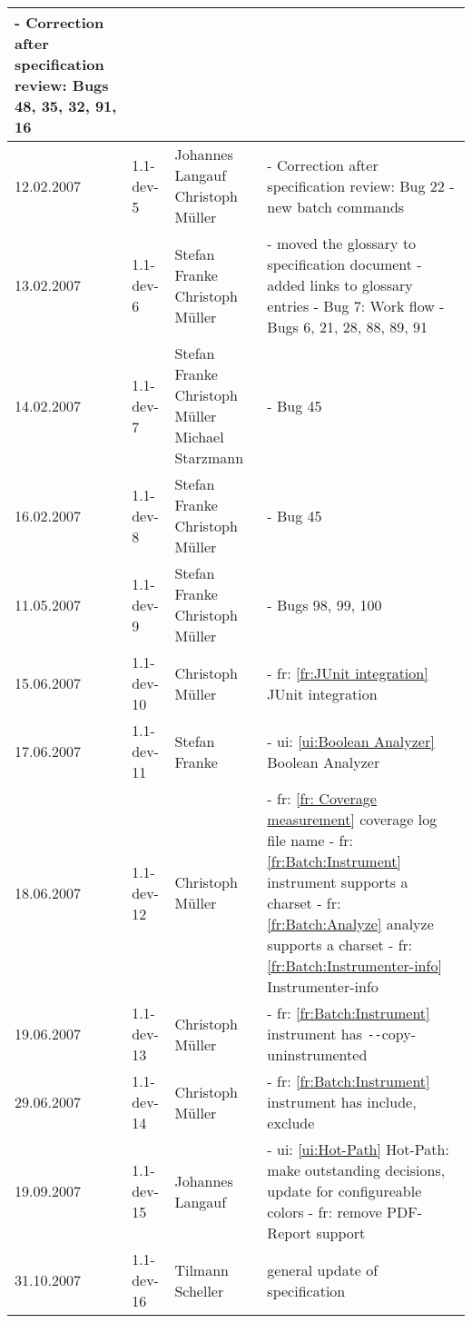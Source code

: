 {\begin{longtable}{|l|l|p{35mm}|p{71mm}|}
      - Correction after specification review: Bugs 48, 35, 32, 91, 16 \\\hline
    12.02.2007 & 1.1-dev-5 & Johannes Langauf \newline Christoph Müller  &
      - Correction after specification review: Bug 22 \newline
      - new batch commands \\\hline
    13.02.2007 & 1.1-dev-6 & Stefan Franke \newline Christoph Müller &
      - moved the glossary to specification document \newline
      - added links to glossary entries \newline
      - Bug 7: Work flow \newline
      - Bugs 6, 21, 28, 88, 89, 91\\\hline
    14.02.2007 & 1.1-dev-7 & Stefan Franke \newline Christoph Müller \newline Michael Starzmann &
      - Bug 45 \\\hline
    16.02.2007 & 1.1-dev-8 & Stefan Franke \newline Christoph Müller &
      - Bug 45 \\\hline
    11.05.2007 & 1.1-dev-9 & Stefan Franke \newline Christoph Müller &
      - Bugs 98, 99, 100 \\\hline
    15.06.2007 & 1.1-dev-10 & Christoph Müller & 
      - fr: \ref{fr:JUnit integration} JUnit integration \\\hline
    17.06.2007 & 1.1-dev-11 & Stefan Franke & 
      - ui: \ref{ui:Boolean Analyzer} Boolean Analyzer \\\hline
    18.06.2007 & 1.1-dev-12 & Christoph Müller & 
      - fr: \ref{fr: Coverage measurement} coverage log file name \newline
      - fr: \ref{fr:Batch:Instrument} instrument supports a charset  \newline
      - fr: \ref{fr:Batch:Analyze} analyze supports a charset \newline
      - fr: \ref{fr:Batch:Instrumenter-info} Instrumenter-info \\\hline
    19.06.2007 & 1.1-dev-13 & Christoph Müller & 
      - fr: \ref{fr:Batch:Instrument} instrument has \verb$--$copy-uninstrumented \\\hline
    29.06.2007 & 1.1-dev-14 & Christoph Müller & 
      - fr: \ref{fr:Batch:Instrument} instrument has include, exclude \\\hline
    19.09.2007 & 1.1-dev-15 & Johannes Langauf & 
      - ui: \ref{ui:Hot-Path} Hot-Path: make outstanding decisions, update for configureable colors \newline
      - fr: remove PDF-Report support \\\hline
     31.10.2007 & 1.1-dev-16  & Tilmann Scheller  & general update of specification
       \\\hline
\end{longtable}
}


